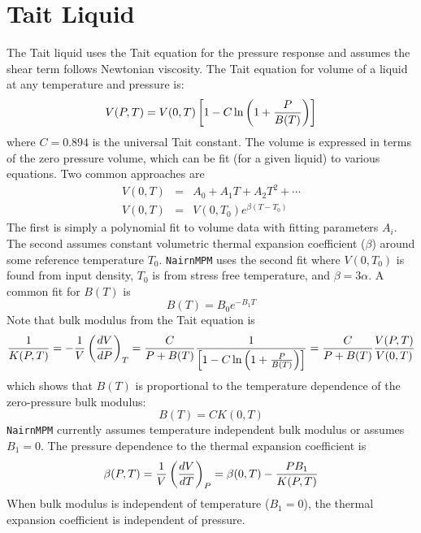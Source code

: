 \documentclass[11pt]{book}
\begin{document}
\section{Tait Liquid}

The Tait liquid uses the Tait equation for the pressure response and assumes the shear term follows Newtonian viscosity. The Tait equation for volume of a liquid at any temperature and pressure is:
\begin{equation}
    V(P,T) = V(0,T)\left[1-C\ln\left(1+{P\over B(T)}\right)\right]
\end{equation}
where $C=0.894$ is the universal Tait constant. The volume is expressed in terms of the zero pressure volume, which can be fit (for a given liquid) to various equations. Two common approaches are
\begin{eqnarray}
      V(0,T) & = & A_0 + A_1T + A_2 T^2 +\cdots \\
      V(0,T) & = & V(0,T_{0})e^{\beta(T-T_{0})}
\end{eqnarray}
The first is simply a polynomial fit to volume data with fitting parameters $A_i$. The second assumes constant volumetric thermal expansion coefficient ($\beta$) around some reference temperature $T_{0}$. {\tt NairnMPM} uses the second fit where $V(0,T_{0})$ is found from input density, $T_{0}$ is from stress free temperature, and $\beta = 3\alpha$. A common fit for $B(T)$ is
\begin{equation}
     B(T) = B_0 e^{-B_1T}
\end{equation}
Note that bulk modulus from the Tait equation is
\begin{equation}
    {1\over K(P,T)} = -{1\over V}\left({dV\over dP}\right)_T = {C\over P+B(T)} {1\over \left[1-C\ln\left(1+{P\over B(T)}\right)\right]} = {C\over P+B(T)} { V(P,T)\over  V(0,T)}
\end{equation}
which shows that $B(T)$ is proportional to the temperature dependence of the zero-pressure bulk modulus:
\begin{equation}
     B(T) = C K(0,T) 
\end{equation}
{\tt NairnMPM} currently assumes temperature independent bulk modulus or assumes $B_1=0$. The pressure dependence to the thermal expansion coefficient is
\begin{equation}
   \beta(P,T) =  {1\over V}\left({dV\over dT}\right)_P= \beta(0,T) - {PB_1\over K(P,T)}
\end{equation}
When bulk modulus is independent of temperature ($B_1=0$), the thermal expansion coefficient is independent of pressure.
\end{document}

